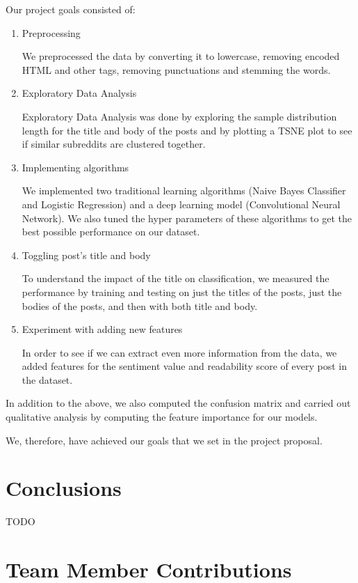 \documentclass{sig-alternate-05-2015}
\begin{document}
Our project goals consisted of:
\begin{enumerate}
    \item Preprocessing
            
            We preprocessed the data by converting it to lowercase, removing encoded HTML and other tags, removing punctuations and stemming the words.
    \item Exploratory Data Analysis 
            
            Exploratory Data Analysis was done by exploring the sample distribution length for the title and body of the posts and by plotting a TSNE plot to see if similar subreddits are clustered together.
    \item Implementing algorithms
            
            We implemented two traditional learning algorithms (Naive Bayes Classifier and Logistic Regression) and a deep learning model (Convolutional Neural Network). We also tuned the hyper parameters of these algorithms to get the best possible performance on our dataset.
    \item Toggling post's title and body
            
            To understand the impact of the title on classification, we measured the performance by training and testing on just the titles of the posts, just the bodies of the posts, and then with both title and body.
    \item Experiment with adding new features
            
            In order to see if we can extract even more information from the data, we added features for the sentiment value and readability score of every post in the dataset. 
            
\end{enumerate}

In addition to the above, we also computed the confusion matrix and carried out qualitative analysis by computing the feature importance for our models.

We, therefore, have achieved our goals that we set in the project proposal.

\section{Conclusions}

TODO

\section{Team Member Contributions}
\end{document}
